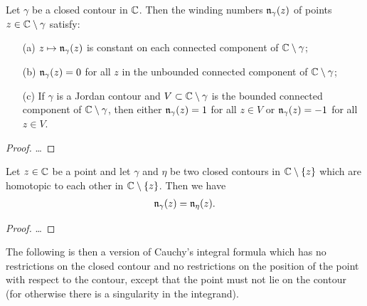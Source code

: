 \begin{lemma}
  \label{lem:winding_number_properties}
  Let $\gamma$ be a closed contour in $\mathbb{C}$. Then the winding
  numbers $\mathfrak{n}_{{\gamma}}(z)$ of points $z \in \mathbb{C} \setminus \gamma$
  satisfy:
  \begin{itemize}
    \item[(a)] $z \mapsto \mathfrak{n}_{{\gamma}}(z)$ is constant on
      each connected component of $\mathbb{C} \setminus \gamma$;
    \item[(b)] $\mathfrak{n}_{{\gamma}}(z) = 0$ for all $z$ in the
      unbounded connected component of $\mathbb{C} \setminus \gamma$;
    \item[(c)] If $\gamma$ is a Jordan contour and
      $V \subset \mathbb{C} \setminus \gamma$ is the bounded connected
      component of $\mathbb{C} \setminus \gamma$, then
      either $\mathfrak{n}_{{\gamma}}(z) = 1$ for all $z \in V$
      or $\mathfrak{n}_{{\gamma}}(z) = -1$ for all $z \in V$.
  \end{itemize}
\end{lemma}
\begin{proof}
  \ldots
\end{proof}

\begin{lemma}
  \label{lem:winding_homotopy_invariance}
  Let $z \in \mathbb{C}$ be a point and let $\gamma$ and $\eta$ be two
  closed contours in $\mathbb{C} \setminus \left\{ z \right\}$ which are homotopic
  to each other in $\mathbb{C} \setminus \left\{ z \right\}$. Then we have
  \begin{align*}
    \mathfrak{n}_{{\gamma}}(z) = \mathfrak{n}_{{\eta}}(z) .
  \end{align*}
\end{lemma}
\begin{proof}
  \ldots
\end{proof}

The following is then a version of Cauchy's integral formula
which has no restrictions on the closed contour and
no restrictions on the position of the point with respect to
the contour, except that the point must not lie on the contour
(for otherwise there is a singularity in the integrand).

